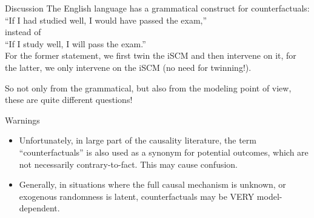 \begin{frame}{Discussion}
The English language has a grammatical construct for counterfactuals:\\
\quad ``If I had studied well, I would have passed the exam,''\\
instead of\\
\quad ``If I study well, I will pass the exam.''\\
For the former statement, we first twin the iSCM and then intervene on it, for the latter, we only intervene on the iSCM (no need for twinning!). 

\bigskip
So not only from the grammatical, but also from the modeling point of view, these are quite different questions!

\bigskip
{}
  \begin{block}{Warnings}
    \begin{itemize}
      \item
  Unfortunately, in large part of the causality literature, the term ``counterfactuals'' is also used 
  as a synonym for potential outcomes, which are not necessarily contrary-to-fact. This may
  cause confusion.
\item Generally, in situations where the full causal mechanism is unknown, or exogenous
randomness is latent, counterfactuals may be VERY model-dependent.
    \end{itemize}
  \end{block}
\end{frame}


